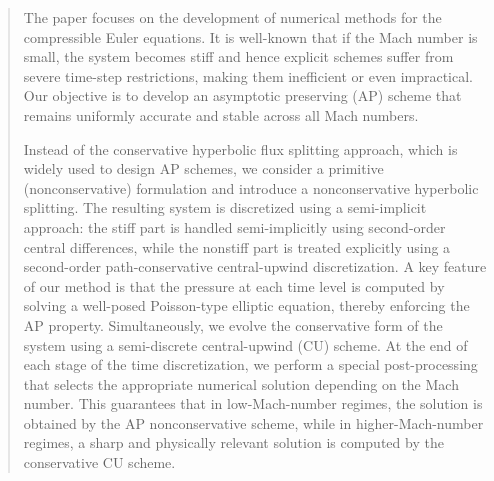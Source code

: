 \documentclass[preprint,12pt]{elsarticle}
\begin{document}
\begin{frontmatter}
\author[SUSTECH]{Alexander Kurganov} %



\author[NCSU]{Lorenzo Micalizzi} %


\begin{abstract}
The paper focuses on the development of numerical methods for the compressible Euler equations. It is well-known that if the Mach number is
small, the system becomes stiff and hence explicit schemes suffer from severe time-step restrictions, making them inefficient or even
impractical. Our objective is to develop an asymptotic preserving (AP) scheme that remains uniformly accurate and stable across all Mach
numbers.

Instead of the conservative hyperbolic flux splitting approach, which is widely used to design AP schemes, we consider a primitive
(nonconservative) formulation and introduce a nonconservative hyperbolic splitting. The resulting system is discretized using a
semi-implicit approach: the stiff part is handled semi-implicitly using second-order central differences, while the nonstiff part is treated
explicitly using a second-order path-conservative central-upwind discretization. A key feature of our method is that the pressure at each
time level is computed by solving a well-posed Poisson-type elliptic equation, thereby enforcing the AP property. Simultaneously, we evolve
the conservative form of the system using a semi-discrete central-upwind (CU) scheme. At the end of each stage of the time discretization,
we perform a special post-processing that selects the appropriate numerical solution depending on the Mach number. This guarantees that in
low-Mach-number regimes, the solution is obtained by the AP nonconservative scheme, while in higher-Mach-number regimes, a sharp and
physically relevant solution is computed by the conservative CU scheme.


\end{abstract}
\end{frontmatter}
\end{document}

